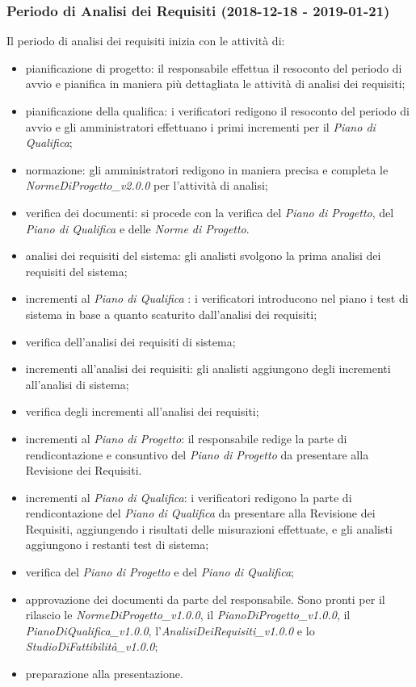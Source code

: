 	\subsubsection{Periodo di Analisi dei Requisiti (2018-12-18 - 2019-01-21)}	
 Il periodo di analisi dei requisiti inizia con le attività di:
			\begin{itemize}
				\item pianificazione di progetto: il responsabile effettua il resoconto del periodo di avvio e pianifica in maniera più dettagliata le attività di analisi dei requisiti; 
				\item pianificazione della qualifica: i verificatori redigono il resoconto del periodo di avvio e gli amministratori effettuano i primi incrementi per il \textit{Piano di Qualifica};
				\item normazione: gli amministratori redigono in maniera precisa e completa le \textit{NormeDiProgetto\_v2.0.0} per l'attività di analisi;
				\item verifica dei documenti: si procede con la verifica del \textit{Piano di Progetto}, del \textit{Piano di Qualifica} e delle \textit{Norme di Progetto}.
				\item analisi dei requisiti del sistema: gli analisti svolgono la prima analisi dei requisiti del sistema;
				\item incrementi al \textit{Piano di Qualifica }: i verificatori introducono nel piano i test di sistema in base a quanto scaturito dall'analisi dei requisiti;
				\item verifica dell'analisi dei requisiti di sistema;
				\item incrementi all'analisi dei requisiti: gli analisti aggiungono degli incrementi all'analisi di sistema;
				\item verifica degli incrementi all'analisi dei requisiti;
				\item incrementi al \textit{Piano di Progetto}: il responsabile redige la parte di rendicontazione e consuntivo del \textit{Piano di Progetto} da presentare alla Revisione dei Requisiti.
				\item incrementi al \textit{Piano di Qualifica}: i verificatori redigono la parte di rendicontazione del \textit{Piano di Qualifica} da presentare alla Revisione dei Requisiti, aggiungendo i risultati delle misurazioni effettuate, e gli analisti aggiungono i restanti test di sistema;
				\item verifica del \textit{Piano di Progetto} e del \textit{Piano di Qualifica};
				\item approvazione dei documenti da parte del responsabile. Sono pronti per il rilascio le \textit{NormeDiProgetto\_v1.0.0}, il \textit{PianoDiProgetto\_v1.0.0}, il \textit{PianoDiQualifica\_v1.0.0}, l'\textit{AnalisiDeiRequisiti\_v1.0.0} e lo \textit{StudioDiFattibilità\_v1.0.0};
				\item preparazione alla presentazione.			
			\end{itemize}
			
